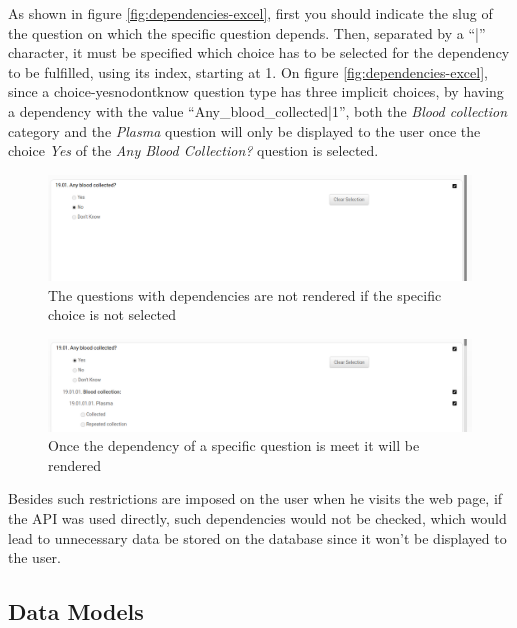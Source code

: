 As shown in figure \ref{fig:dependencies-excel}, first you should indicate the slug of the question on which the specific question depends.
Then, separated by a ``|'' character, it must be specified which choice has to be selected for the dependency to be fulfilled, using its index, starting at 1.
On figure \ref{fig:dependencies-excel}, since a choice-yesnodontknow question type has three implicit choices, by having a dependency with the value ``Any\_blood\_collected|1'', both the \textit{Blood collection} category and the \textit{Plasma} question will only be displayed to the user once the choice \textit{Yes} of the \textit{Any Blood Collection?} question is selected.

\begin{figure}[H]
    \center
    \includegraphics[width=0.75\linewidth]{dependencies-no}
    \caption{The questions with dependencies are not rendered if the specific choice is not selected}
    \label{fig:dependencies-no}
\end{figure}

\begin{figure}[H]
    \center
    \includegraphics[width=0.75\linewidth]{dependencies-yes}
    \caption{Once the dependency of a specific question is meet it will be rendered}
    \label{fig:dependencies-yes}
\end{figure}

Besides such restrictions are imposed on the user when he visits the web page, if the API was used directly, such dependencies would not be checked, which would lead to unnecessary data be stored on the database since it won't be displayed to the user.

\subsection{Data Models}

